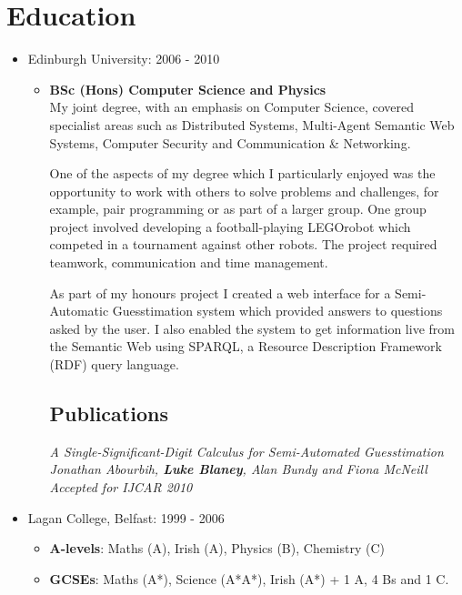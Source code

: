 \documentclass[a4paper]{article}
\begin{document}
\section*{Education}
\begin{itemize}

\item Edinburgh University: 2006 - 2010 \begin{itemize}\item {\bf BSc (Hons) Computer Science and Physics}\\
My joint degree, with an emphasis on Computer Science, covered specialist areas such as Distributed Systems, Multi-Agent Semantic Web Systems, Computer Security and Communication \& Networking.

One of the aspects of my degree which I particularly enjoyed was the opportunity to work with others to solve problems and challenges, for example, pair programming or as part of a larger group.  One group project involved developing a football-playing LEGO\textregistered robot which competed in a tournament against other robots.  The project required teamwork, communication and time management.  

As part of my honours project I created a web interface for a Semi-Automatic Guesstimation system which provided answers to questions asked by the user.   I also enabled the system to get information live from the Semantic Web using SPARQL, a Resource Description Framework (RDF) query language.
\subsection*{Publications}
\em A Single-Significant-Digit Calculus for Semi-Automated Guesstimation \em\\
Jonathan Abourbih, {\bf Luke Blaney}, Alan Bundy and Fiona McNeill\\
Accepted for IJCAR 2010
\end{itemize}

\item Lagan College, Belfast: 1999 - 2006
\begin{itemize}\item {\bf A-levels}: Maths (A), Irish (A), Physics (B), Chemistry (C)
\item {\bf GCSEs}: Maths (A*), Science (A*A*), Irish (A*) + 1 A, 4 Bs and 1 C.
\end{itemize}

\end{itemize}
\end{document}
